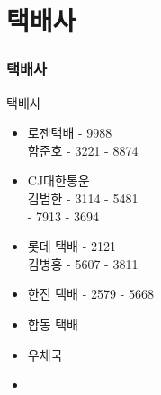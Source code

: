 \documentclass[aspectratio=1610,20pt,xcolor=pdftex,dvipsnames,table,handout]{beamer}
\begin{document}
		\begin{frame} [t,plain]
		\end{frame}						

		\section{택배사 }
		\begin{frame} [t,plain]
		\frametitle{택배사 }
			\begin{block} {택배사 }
			\setlength{\leftmargini}{2em}			
			\begin{itemize}
				\item 로젠택배 	 - 9988 \\
						함준호 	 - 3221 - 8874 	
						\\ 	\hrulefill 	
						
				\item CJ대한통운 \hrulefill \\
						김범한 	 - 3114 - 5481 \\
								 - 7913 - 3694 
						\\ 	\hrulefill 	

				\item 롯데 택배 	 - 2121 \\
						김병홍	 - 5607 - 3811 	
						\\ 	\hrulefill 	

				\item 한진 택배	\hrulefill 
								 - 2579 - 5668	
						\\ 	\hrulefill 	

				\item 합동 택배	\hrulefill 
								\hrulefill 
						\\ 	\hrulefill 	

				\item 우체국		\hrulefill
						\\ 	\hrulefill 	

				\item 
			\end{itemize}
			\end{block}						
		\end{frame}						

		\begin{frame} [t,plain]
		\end{frame}						
\end{document}
